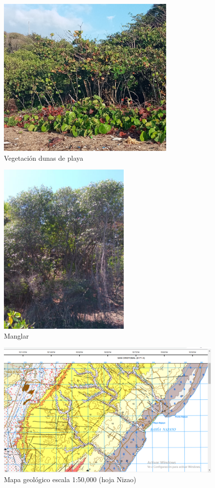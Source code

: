 \documentclass[11pt,]{article}
\begin{document}
\begin{figure}
\centering
\includegraphics[height=3.12500in]{Cocoloba_uvifera.jpg}
\caption{Vegetación dunas de playa\label{cocoloba}}
\end{figure}

\begin{figure}
\centering
\includegraphics[height=3.38542in]{mangle_rojo.png}
\caption{Manglar\label{manglerojo}}
\end{figure}

\begin{figure}
\centering
\includegraphics{mapa_bahia_najayo.png}
\caption{Mapa geológico escala 1:50,000 (hoja Nizao)\label{mapageo50k}}
\end{figure}
\end{document}
